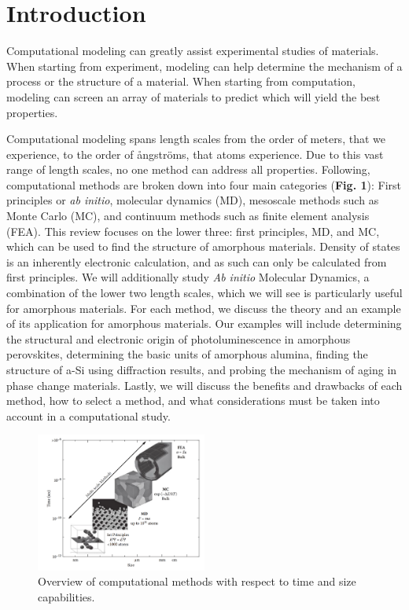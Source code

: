 \documentclass[3p,review,12pt]{elsarticle}
\begin{document}
\section{Introduction}
Computational modeling can greatly assist experimental studies of materials. When starting from experiment, modeling can help determine the mechanism of a process or the structure of a material. When starting from computation, modeling can screen an array of materials to predict which will yield the best properties.
\par
Computational modeling spans length scales from the order of meters, that we experience, to the order of \aa ngstr\"oms, that atoms experience. Due to this vast range of length scales, no one method can address all properties. Following, computational methods are broken down into four main categories (\textbf{Fig. 1}): First principles or \textit{ab initio}, molecular dynamics (MD), mesoscale methods such as Monte Carlo (MC), and continuum methods such as finite element analysis (FEA)\cite{Lee2012}. This review focuses on the lower three: first principles, MD, and MC, which can be used to find the structure of amorphous materials. Density of states is an inherently electronic calculation, and as such can only be calculated from first principles. We will additionally study \textit{Ab initio} Molecular Dynamics, a combination of the lower two length scales, which we will see is particularly useful for amorphous materials. For each method, we discuss the theory and an example of its application for amorphous materials. Our examples will include determining the structural and electronic origin of photoluminescence in amorphous perovskites, determining the basic units of amorphous alumina, finding the structure of a-Si using diffraction results, and probing the mechanism of aging in phase change materials. Lastly, we will discuss the benefits and drawbacks of each method, how to select a method,  and what considerations must be taken into  account in a computational study.
\begin{figure}[H]
	\includegraphics[width=0.5\textwidth]{overview}
	\centering
	\caption{Overview of computational methods with respect to time and size capabilities. \cite{Lee2012}}
\end{figure}
\end{document}
